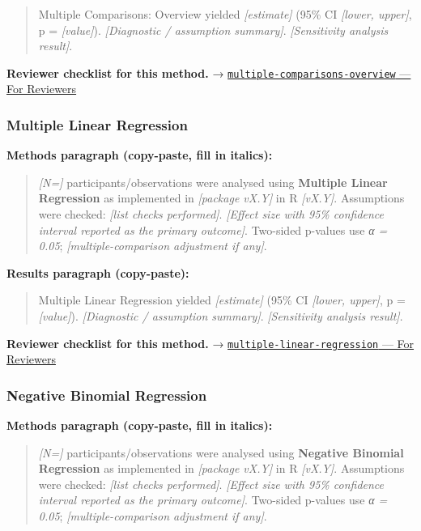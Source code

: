 \documentclass[
]{article}
\begin{document}
\begin{quote}
Multiple Comparisons: Overview yielded \emph{{[}estimate{]}} (95\% CI
\emph{{[}lower, upper{]}}, p = \emph{{[}value{]}}). \emph{{[}Diagnostic
/ assumption summary{]}}. \emph{{[}Sensitivity analysis result{]}}.
\end{quote}

\textbf{Reviewer checklist for this method.} →
\href{../chapters/04-inferential/multiple-comparisons-overview.Rmd\#for-reviewers}{\texttt{multiple-comparisons-overview}
--- For Reviewers}

\subsubsection{Multiple Linear
Regression}\label{multiple-linear-regression}

\textbf{Methods paragraph (copy-paste, fill in italics):}

\begin{quote}
\emph{{[}N={]}} participants/observations were analysed using
\textbf{Multiple Linear Regression} as implemented in \emph{{[}package
vX.Y{]}} in R \emph{{[}vX.Y{]}}. Assumptions were checked: \emph{{[}list
checks performed{]}}. \emph{{[}Effect size with 95\% confidence interval
reported as the primary outcome{]}}. Two-sided p-values use \emph{α =
0.05}; \emph{{[}multiple-comparison adjustment if any{]}}.
\end{quote}

\textbf{Results paragraph (copy-paste):}

\begin{quote}
Multiple Linear Regression yielded \emph{{[}estimate{]}} (95\% CI
\emph{{[}lower, upper{]}}, p = \emph{{[}value{]}}). \emph{{[}Diagnostic
/ assumption summary{]}}. \emph{{[}Sensitivity analysis result{]}}.
\end{quote}

\textbf{Reviewer checklist for this method.} →
\href{../chapters/07-regression/multiple-linear-regression.Rmd\#for-reviewers}{\texttt{multiple-linear-regression}
--- For Reviewers}

\subsubsection{Negative Binomial
Regression}\label{negative-binomial-regression}

\textbf{Methods paragraph (copy-paste, fill in italics):}

\begin{quote}
\emph{{[}N={]}} participants/observations were analysed using
\textbf{Negative Binomial Regression} as implemented in \emph{{[}package
vX.Y{]}} in R \emph{{[}vX.Y{]}}. Assumptions were checked: \emph{{[}list
checks performed{]}}. \emph{{[}Effect size with 95\% confidence interval
reported as the primary outcome{]}}. Two-sided p-values use \emph{α =
0.05}; \emph{{[}multiple-comparison adjustment if any{]}}.
\end{quote}
\end{document}
